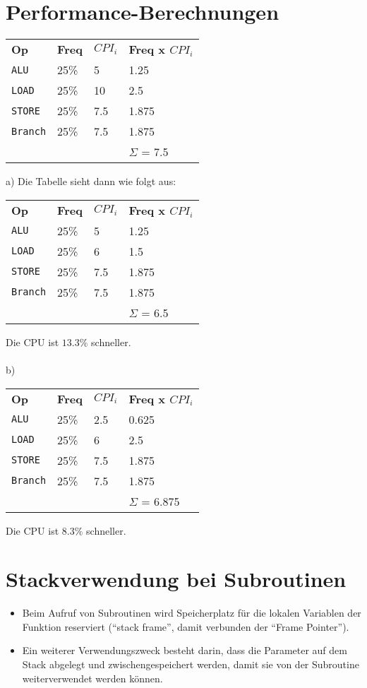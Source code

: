 \documentclass[a4paper,10pt,headlines=3.2]{scrartcl}
\begin{document}
\section{Performance-Berechnungen}
\begin{center}
\begin{tabular}{llll}
\textbf{Op} & \textbf{Freq} & \textbf{$CPI_i$} & \textbf{Freq x $CPI_i$}\\
\texttt{ALU} & 25\% & 5 & 1.25\\
\texttt{LOAD} & 25\% & 10 & 2.5\\
\texttt{STORE} & 25\% & 7.5 & 1.875\\
\texttt{Branch} & 25\% & 7.5 & 1.875\\
 & & & $\Sigma$ = 7.5
\end{tabular}
\end{center}
a) Die Tabelle sieht dann wie folgt aus:
\begin{center}
\begin{tabular}{llll}
\textbf{Op} & \textbf{Freq} & \textbf{$CPI_i$} & \textbf{Freq x $CPI_i$}\\
\texttt{ALU} & 25\% & 5 & 1.25\\
\texttt{LOAD} & 25\% & 6 & 1.5\\
\texttt{STORE} & 25\% & 7.5 & 1.875\\
\texttt{Branch} & 25\% & 7.5 & 1.875\\
 & & & $\Sigma$ = 6.5
\end{tabular}
\end{center}
Die CPU ist $13.3\%$ schneller. \\\\
b)
\begin{center}
\begin{tabular}{llll}
\textbf{Op} & \textbf{Freq} & \textbf{$CPI_i$} & \textbf{Freq x $CPI_i$}\\
\texttt{ALU} & 25\% & 2.5 & 0.625 \\
\texttt{LOAD} & 25\% & 6 & 2.5\\
\texttt{STORE} & 25\% & 7.5 & 1.875\\
\texttt{Branch} & 25\% & 7.5 & 1.875\\
 & & & $\Sigma$ = 6.875
\end{tabular}
\end{center}
Die CPU ist $8.3\%$ schneller. 

\section{Stackverwendung bei Subroutinen}
\begin{itemize}
\item Beim Aufruf von Subroutinen wird Speicherplatz für die lokalen Variablen der Funktion reserviert (``stack frame'', damit verbunden der ``Frame Pointer''). \\
\item Ein weiterer Verwendungszweck besteht darin, dass die Parameter auf dem Stack abgelegt und zwischengespeichert werden, damit sie von der Subroutine weiterverwendet werden können.
\end{itemize}
\end{document}
